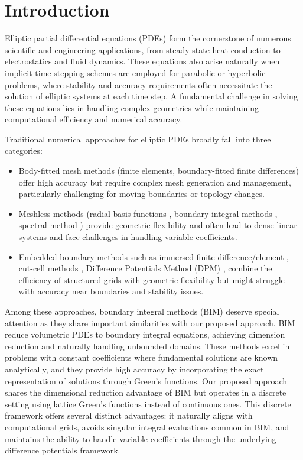 \section{Introduction}

Elliptic partial differential equations (PDEs) form the cornerstone of numerous scientific and engineering applications, from steady-state heat conduction to electrostatics and fluid dynamics. These equations also arise naturally when implicit time-stepping schemes are employed for parabolic or hyperbolic problems, where stability and accuracy requirements often necessitate the solution of elliptic systems at each time step. A fundamental challenge in solving these equations lies in handling complex geometries while maintaining computational efficiency and numerical accuracy.

Traditional numerical approaches for elliptic PDEs broadly fall into three categories:
\begin{itemize}
\item Body-fitted mesh methods (finite elements, boundary-fitted finite differences) \cite{barrett1987fitted} offer high accuracy but require complex mesh generation and management, particularly challenging for moving boundaries or topology changes.
\item Meshless methods (radial basis functions \cite{fornberg2015solving}, boundary integral methods \cite{mckenney1995fast,zhong2018implicit,zhou2024correction,ying2013kernel}, spectral method \cite{gu2021efficient}) provide geometric flexibility and often lead to dense linear systems and face challenges in handling variable coefficients.
\item Embedded boundary methods such as immersed finite difference/element \cite{peskin2002immersed,leveque1994immersed}, cut-cell methods \cite{chen2023arbitrarily,chen2021adaptive,hansbo2002unfitted,hansbo2014cut}, Difference Potentials Method (DPM) \cite{ryaben2012method}, combine the efficiency of structured grids with geometric flexibility but might struggle with accuracy near boundaries and stability issues.
\end{itemize}

Among these approaches, boundary integral methods (BIM) deserve special attention as they share important similarities with our proposed approach. BIM reduce volumetric PDEs to boundary integral equations, achieving dimension reduction and naturally handling unbounded domains. These methods excel in problems with constant coefficients where fundamental solutions are known analytically, and they provide high accuracy by incorporating the exact representation of solutions through Green's functions.
Our proposed approach shares the dimensional reduction advantage of BIM but operates in a discrete setting using lattice Green's functions instead of continuous ones. This discrete framework offers several distinct advantages: it naturally aligns with computational grids, avoids singular integral evaluations common in BIM, and maintains the ability to handle variable coefficients through the underlying difference potentials framework. 

